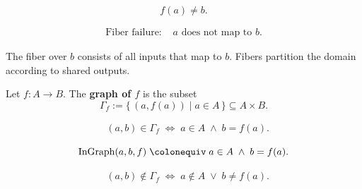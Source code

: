 \begin{remark*}
\[
f(a) \ne b.
\]
\end{remark*}

\begin{remark*}
\[
\begin{aligned}
\text{Fiber failure: } 
&a \text{ does not map to } b.
\end{aligned}
\]
\end{remark*}

\begin{remark*}[Interpretation]
The fiber over $b$ consists of all inputs that map to $b$.
Fibers partition the domain according to shared outputs.
\end{remark*}















\begin{tcolorbox}[title={Definition --- Graph of a Function}]
\begin{definition}
\label{def:alg-graph}
Let $f : A \to B$. The \textbf{graph of $f$} is the subset
\[
  \Gamma_f := \{\,(a, f(a)) \mid a \in A\,\} \subseteq A \times B.
\]
\end{definition}
\end{tcolorbox}

\begin{remark*}
\[
\begin{aligned}
&(a,b) \in \Gamma_f
\;\Longleftrightarrow\;
a \in A \;\land\; b = f(a).
\end{aligned}
\]
\end{remark*}

\begin{remark*}
\[
\operatorname{InGraph}(a,b,f)
\;\colonequiv\;
a \in A \;\land\; b = f(a).
\]
\end{remark*}

\begin{remark*}
\[
\begin{aligned}
&(a,b) \notin \Gamma_f
\;\Longleftrightarrow\;
a \notin A
\;\lor\;
b \ne f(a).
\end{aligned}
\]
\end{remark*}

